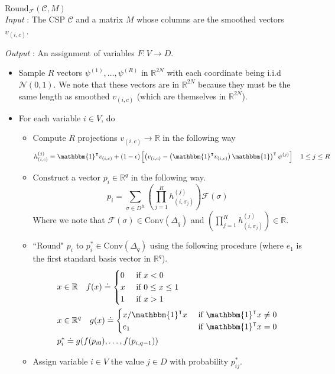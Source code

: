 \documentclass[letterpaper, 12pt]{article}
\numberwithin{equation}{section}
\begin{document}
\begin{algorithm}\textbf{ $\text{Round}_{\mathcal{F}}(\mathcal{C},M)$} \\

\textit{Input} : The CSP $\mathcal{C}$ and a matrix $M$ whose columns are the smoothed vectors $v_{(i,c)}$.

\textit{Output} : An assignment of variables $F : V \to D$. 
\begin{itemize}
\item Sample $R$ vectors $\psi^{(1)},\ldots,\psi^{(R)}$ in $\mathbb{R}^{2N}$ with each coordinate being i.i.d $\mathcal{N}(0,1)$. We note that these vectors are in $\mathbb{R}^{2N}$ because they must be the same length as smoothed $v_{(i,c)}$ (which are themselves in $\mathbb{R}^{2N}$).
\item For each variable $i \in V$, do
	\begin{itemize}
	\item Compute $R$ projections $v_{(i,c)} \to \mathbb{R}$ in the following way
		\begin{equation}
			h^{(j)}_{(i,c)} = \mathbbm{1}^\intercal v_{(i,c)} 
				+ (1-\epsilon) \left[ \left(v_{(i,c)} - \left(\mathbbm{1}^\intercal v_{(i,c)}
				\right)\mathbbm{1}\right)^\intercal \psi^{(j)}\right]  \quad 1 \leq j \leq R
		\end{equation}
	\item Construct a vector $p_i \in \mathbb{R}^q$ in the following way.
		\begin{equation}
			p_i = \sum_{\sigma \in D^R} \left( \prod_{j = 1}^R h^{(j)}_{(i,\sigma_j)} \right) \mathcal{F}(\sigma)
		\end{equation}
		Where we note that $\mathcal{F}(\sigma) \in \text{Conv}(\Delta_q)$ and 
		$\left( \prod_{j = 1}^R h^{(j)}_{(i,\sigma_j)} \right) \in \mathbb{R}$.
	\item ``Round" $p_i$ to $p_i^* \in \text{Conv}(\Delta_q)$ using the following procedure (where $e_1$ is the first standard basis vector in $\mathbb{R}^q$).
		\begin{align}
			&x \in \mathbb{R} ~~~ f(x) \doteq \begin{cases} 0 & \text{ if } x < 0 \\ 
									x & \text{ if } 0 \leq x \leq 1 \\
									1 & \text{ if } x > 1 
						\end{cases} \\
			&x \in \mathbb{R}^q ~~~ g(x) \doteq 
								\begin{cases}
								x/\mathbbm{1}^\intercal x &\text{ if } \mathbbm{1}^\intercal x \neq 0 \\
								e_1 						 &\text{ if } \mathbbm{1}^\intercal x = 0
								\end{cases} \\
			& p_i^* \doteq g(f(p_{i0}),\ldots,f(p_{i,q-1}))
		\end{align}
	\item Assign variable $i \in V$ the value $j \in D$ with probability $p^*_{ij}$.
	\end{itemize}
\end{itemize}
\end{algorithm}
\end{document}
